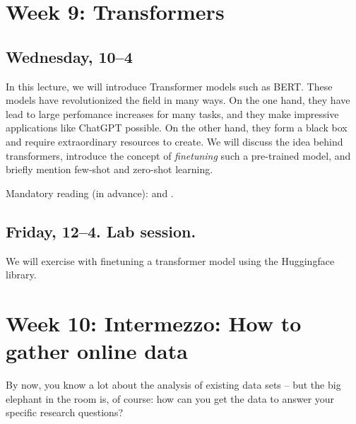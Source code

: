 
\section*{Week 9: Transformers}

\subsection*{Wednesday, 10--4}
In this lecture, we will introduce Transformer models such as BERT.  These models have revolutionized the field in many ways. On the one hand, they have lead to large perfomance increases for many tasks, and they make impressive applications like ChatGPT possible. On the other hand, they form a black box and require extraordinary resources to create. We will discuss the idea behind transformers, introduce the concept of \emph{finetuning} such a pre-trained model, and briefly mention few-shot and zero-shot learning.

Mandatory reading (in advance): \cite{Lin2023} and \cite{Bender2021}.




\subsection*{Friday, 12--4. Lab session.}

We will exercise with finetuning a transformer model using the Huggingface library.







\section*{Week 10: Intermezzo: How to gather online data}
By now, you know a lot about the analysis of existing data sets -- but the big elephant in the room is, of course: how can you get the data to answer your specific research questions?

